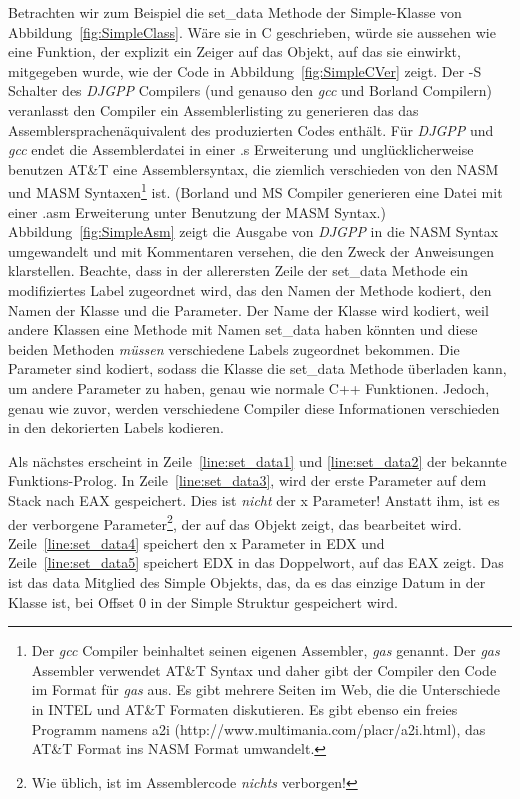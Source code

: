 Betrachten wir zum Beispiel die {\code set\_data} Methode der {\code
Simple}-Klasse von Abbildung~\ref{fig:SimpleClass}. W\"{a}re sie in C
geschrieben, w\"{u}rde sie aussehen wie eine Funktion, der explizit ein
Zeiger auf das Objekt, auf das sie einwirkt, mitgegeben wurde, wie
der Code in Abbildung~\ref{fig:SimpleCVer} zeigt. Der {\code -S}
Schalter des \emph{DJGPP}  Compilers (und
genauso den \emph{gcc}  und Borland
 Compilern) veranlasst den Compiler ein
Assemblerlisting zu generieren das das Assemblersprachen\"{a}quivalent
des produzierten Codes enth\"{a}lt. F\"{u}r \emph{DJGPP} und \emph{gcc}
endet die Assemblerdatei in einer {\code .s} Erweiterung und
ungl\"{u}cklicherweise benutzen AT\&T eine Assemblersyntax, die ziemlich
verschieden von den NASM und MASM Syntaxen\footnote{Der \emph{gcc}
Compiler beinhaltet seinen eigenen Assembler, \emph{gas} 
genannt. Der \emph{gas} Assembler verwendet AT\&T Syntax und daher
gibt der Compiler den Code im Format f\"{u}r \emph{gas} aus. Es gibt
mehrere Seiten im Web, die die Unterschiede in INTEL und AT\&T
Formaten diskutieren. Es gibt ebenso ein freies Programm namens
{\code a2i} ({http://www.multimania.com/placr/a2i.html}), das AT\&T
Format ins NASM  Format umwandelt.} ist.
(Borland und MS Compiler generieren eine Datei mit einer {\code
.asm} Erweiterung unter Benutzung der MASM Syntax.)
Abbildung~\ref{fig:SimpleAsm} zeigt die Ausgabe von \emph{DJGPP} in
die NASM Syntax umgewandelt und mit Kommentaren versehen, die den
Zweck der Anweisungen klarstellen. Beachte, dass in der allerersten
Zeile der {\code set\_data} Methode ein modifiziertes Label
zugeordnet wird, das den Namen der Methode kodiert, den Namen der
Klasse und die Parameter. Der Name der Klasse wird kodiert, weil
andere Klassen eine Methode mit Namen {\code set\_data} haben
k\"{o}nnten und diese beiden Methoden \emph{m\"{u}ssen} verschiedene Labels
zugeordnet bekommen. Die Parameter sind kodiert, sodass die Klasse
die {\code set\_data} Methode \"{u}berladen kann, um andere Parameter zu
haben, genau wie normale C++ Funktionen. Jedoch, genau wie zuvor,
werden verschiedene Compiler diese Informationen verschieden in den
dekorierten Labels kodieren.

Als n\"{a}chstes erscheint in Zeile~\ref{line:set_data1} und
\ref{line:set_data2} der bekannte Funktions-Prolog.
 In Zeile~\ref{line:set_data3}, wird der
erste Parameter auf dem Stack nach {\code EAX} gespeichert. Dies ist
\emph{nicht} der {\code x} Parameter! Anstatt ihm, ist es der
verborgene Parameter\footnote{Wie \"{u}blich, ist im Assemblercode
\emph{nichts} verborgen!}, der auf das Objekt zeigt, das bearbeitet
wird. Zeile~\ref{line:set_data4} speichert den {\code x} Parameter
in {\code EDX} und Zeile~\ref{line:set_data5} speichert {\code EDX}
in das Doppelwort, auf das {\code EAX} zeigt. Das ist das {\code
data} Mitglied des {\code Simple} Objekts, das, da es das einzige
Datum in der Klasse ist, bei Offset 0 in der {\code Simple} Struktur
gespeichert wird.

